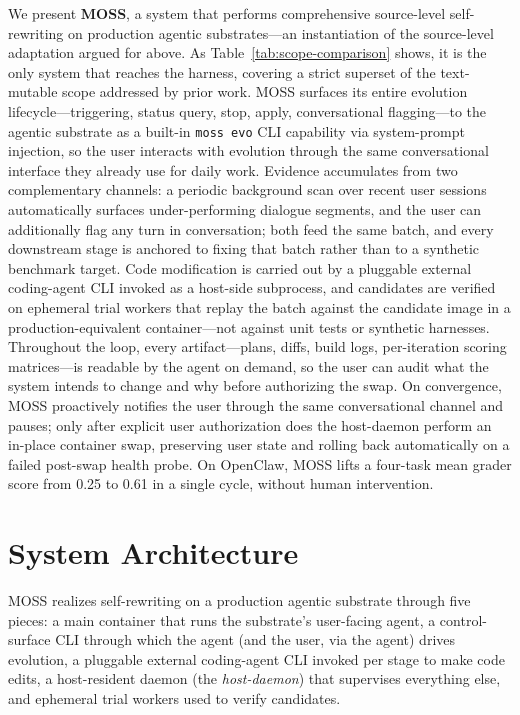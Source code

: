 \documentclass{article}
\begin{document}
We present \textbf{MOSS}, a system that performs comprehensive source-level self-rewriting on production agentic substrates---an instantiation of the source-level adaptation argued for above. As Table~\ref{tab:scope-comparison} shows, it is the only system that reaches the harness, covering a strict superset of the text-mutable scope addressed by prior work. MOSS surfaces its entire evolution lifecycle---triggering, status query, stop, apply, conversational flagging---to the agentic substrate as a built-in \texttt{moss evo} CLI capability via system-prompt injection, so the user interacts with evolution through the same conversational interface they already use for daily work. Evidence accumulates from two complementary channels: a periodic background scan over recent user sessions automatically surfaces under-performing dialogue segments, and the user can additionally flag any turn in conversation; both feed the same batch, and every downstream stage is anchored to fixing that batch rather than to a synthetic benchmark target. Code modification is carried out by a pluggable external coding-agent CLI invoked as a host-side subprocess, and candidates are verified on ephemeral trial workers that replay the batch against the candidate image in a production-equivalent container---not against unit tests or synthetic harnesses. Throughout the loop, every artifact---plans, diffs, build logs, per-iteration scoring matrices---is readable by the agent on demand, so the user can audit what the system intends to change and why before authorizing the swap. On convergence, MOSS proactively notifies the user through the same conversational channel and pauses; only after explicit user authorization does the host-daemon perform an in-place container swap, preserving user state and rolling back automatically on a failed post-swap health probe. On OpenClaw, MOSS lifts a four-task mean grader score from 0.25 to 0.61 in a single cycle, without human intervention.



\section{System Architecture}
\label{sec:arch}

MOSS realizes self-rewriting on a production agentic substrate through five pieces: a main container that runs the substrate's user-facing agent, a control-surface CLI through which the agent (and the user, via the agent) drives evolution, a pluggable external coding-agent CLI invoked per stage to make code edits, a host-resident daemon (the \emph{host-daemon}) that supervises everything else, and ephemeral trial workers used to verify candidates.
\end{document}
